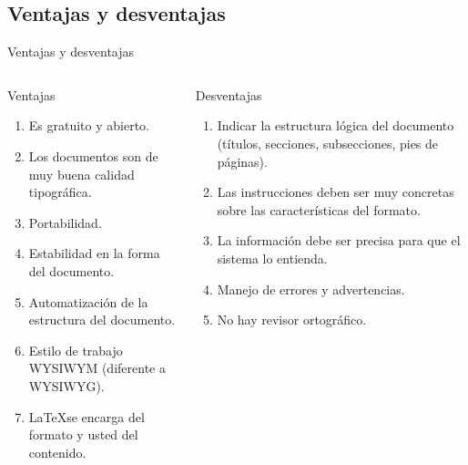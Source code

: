 \documentclass[aspectratio=169, 10pt]{beamer}
\begin{document}
\subsection{Ventajas y desventajas}
\begin{frame}{Ventajas y desventajas}
\begin{columns} 
    \begin{column}{.48\linewidth}
        \begin{exampleblock}{Ventajas}
        \pause
            \begin{enumerate}
            \item Es gratuito y abierto.
            \item Los documentos son de muy buena calidad tipográfica. 
            \item Portabilidad.
            \item Estabilidad en la forma del documento. 
            \item Automatización de la estructura del documento.
            \item Estilo de trabajo WYSIWYM (diferente a WYSIWYG). 
            \item \LaTeX se encarga del formato y usted del contenido.
    \end{enumerate}
        \end{exampleblock}
        
    \end{column}

    \begin{column}{.48\linewidth} \pause
    \vspace{-5.5mm}
        \begin{exampleblock}{Desventajas} \pause
            \begin{enumerate}
                \item Indicar la estructura lógica del documento (títulos, secciones, subsecciones, pies de páginas).
                \item Las instrucciones deben ser muy concretas sobre las características del formato. 
                \item La información debe ser precisa para que el sistema lo entienda. 
                \item Manejo de errores y advertencias. 
                \item No hay revisor ortográfico.
            \end{enumerate}
        \end{exampleblock}
        
    \end{column}
\end{columns}
    
\end{frame}
\end{document}
